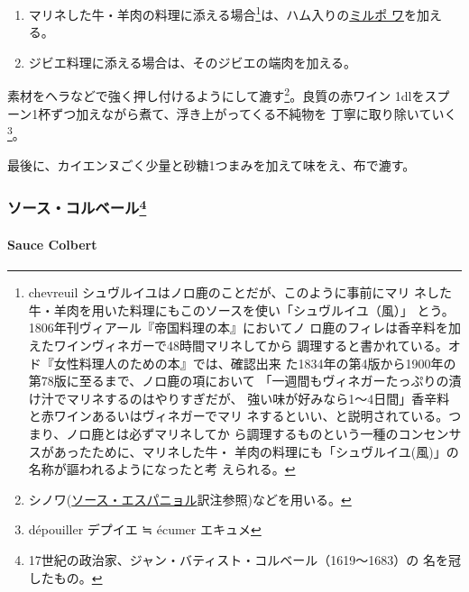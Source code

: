 \begin{recette}
\begin{enumerate}
\def\labelenumi{\arabic{enumi}.}
\item
  マリネした牛・羊肉の料理に添える場合\footnote{chevreuil
    シュヴルイユはノロ鹿のことだが、このように事前にマリ
    ネした牛・羊肉を用いた料理にもこのソースを使い「シュヴルイユ（風）」
    とう。1806年刊ヴィアール『帝国料理の本』においてノ
    ロ鹿のフィレは香辛料を加えたワインヴィネガーで48時間マリネしてから
    調理すると書かれている。オド『女性料理人のための本』では、確認出来
    た1834年の第4版から1900年の第78版に至るまで、ノロ鹿の項において
    「一週間もヴィネガーたっぷりの漬け汁でマリネするのはやりすぎだが、
    強い味が好みなら1〜4日間」香辛料と赤ワインあるいはヴィネガーでマリ
    ネするといい、と説明されている。つまり、ノロ鹿とは必ずマリネしてか
    ら調理するものという一種のコンセンサスがあったために、マリネした牛・
    羊肉の料理にも「シュヴルイユ(風)」の名称が謳われるようになったと考
    えられる。}は、ハム入りの\protect\hyperlink{mirepoix}{ミルポ
  ワ}を加える。
\item
  ジビエ料理に添える場合は、そのジビエの端肉を加える。
\end{enumerate}

素材をヘラなどで強く押し付けるようにして漉す\footnote{シノワ(\protect\hyperlink{sauce-espagnole}{ソース・エスパニョル}訳注参照)などを用いる。}。良質の赤ワイン
1\undemi{}dlをスプーン1杯ずつ加えながら煮て、浮き上がってくる不純物を
丁寧に取り除いていく\footnote{dépouiller デプイエ ≒ écumer エキュメ}。

最後に、カイエンヌごく少量と砂糖1つまみを加えて味をえ、布で漉す。

\maeaki

\hypertarget{ux30bdux30fcux30b9ux30b3ux30ebux30d9ux30fcux30eb23}{%
\subsubsection[ソース・コルベール]{\texorpdfstring{ソース・コルベール\footnote{17世紀の政治家、ジャン・バティスト・コルベール（1619〜1683）の
  名を冠したもの。}}{ソース・コルベール}}\label{ux30bdux30fcux30b9ux30b3ux30ebux30d9ux30fcux30eb23}}

\hypertarget{sauce-colbert}{%
\paragraph{Sauce Colbert}\label{sauce-colbert}}



\end{recette}
